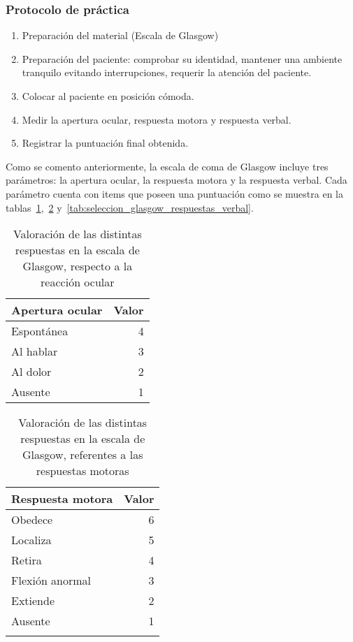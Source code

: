 \subsubsection{Protocolo de práctica}

\begin{enumerate}
\item Preparación del material (Escala de Glasgow)
\item Preparación del paciente: comprobar su identidad, mantener una ambiente
    tranquilo evitando interrupciones, requerir la atención del paciente.
\item Colocar al paciente en posición cómoda.
\item Medir la apertura ocular, respuesta motora y respuesta verbal.
\item Registrar la puntuación final obtenida.
\end{enumerate}

Como se comento anteriormente, la escala de coma de Glasgow incluye tres
parámetros: la apertura ocular, la respuesta motora y la respuesta verbal. Cada
parámetro cuenta con items que poseen una puntuación como se muestra en la
tablas~\ref{tab:seleccion_glasgow_respuestas_ocular},~\ref{tab:seleccion_glasgow_respuestas_motor}
y~\ref{tab:seleccion_glasgow_respuestas_verbal}. 

\begin{table}[!hbt]
\centering
\begin{tabular}{lr}
\toprule
\textbf{Apertura ocular} & \textbf{Valor} \\
\midrule
Espontánea & 4 \\
Al hablar & 3 \\
Al dolor & 2 \\
Ausente & 1 \\
\bottomrule
\end{tabular}
\caption{Valoración de las distintas respuestas en la escala de Glasgow,
    respecto a la reacción ocular}
\label{tab:seleccion_glasgow_respuestas_ocular}
\end{table}

\begin{table}[!hbt]
\centering
\begin{tabular}{lr}
\toprule
\textbf{Respuesta motora} & \textbf{Valor} \\
\midrule
Obedece & 6 \\
Localiza & 5 \\
Retira & 4 \\
Flexión anormal & 3 \\
Extiende & 2 \\
Ausente & 1 \\
 & \\
\bottomrule
\end{tabular}
\caption{Valoración de las distintas respuestas en la escala de Glasgow,
    referentes a las respuestas motoras}
\label{tab:seleccion_glasgow_respuestas_motor}
\end{table}

